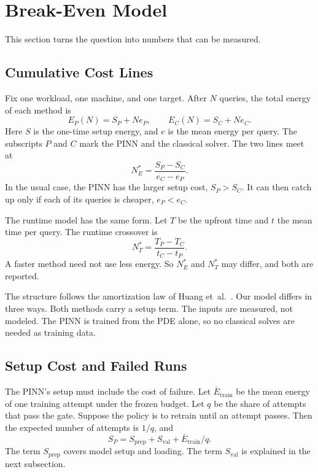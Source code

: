 \documentclass[journal]{IEEEtran}
\newcommand{\Nstar}{N^{\ast}}
\begin{document}
\section{Break-Even Model}\label{sec:model}

This section turns the question into numbers that can be measured.

\subsection{Cumulative Cost Lines}
Fix one workload, one machine, and one target. After $N$ queries, the total energy of each method is
\begin{equation}
E_P(N)=S_P+N e_P,\qquad E_C(N)=S_C+N e_C .
\label{eq:cost}
\end{equation}
Here $S$ is the one-time setup energy, and $e$ is the mean energy per query. The subscripts $P$ and $C$ mark the PINN and the classical solver. The two lines meet at
\begin{equation}
\Nstar_E=\frac{S_P-S_C}{e_C-e_P}.
\label{eq:nstar}
\end{equation}
In the usual case, the PINN has the larger setup cost, $S_P>S_C$. It can then catch up only if each of its queries is cheaper, $e_P<e_C$.

The runtime model has the same form. Let $T$ be the upfront time and $t$ the mean time per query. The runtime crossover is
\begin{equation}
\Nstar_T=\frac{T_P-T_C}{t_C-t_P}.
\label{eq:ntime}
\end{equation}
A faster method need not use less energy. So $\Nstar_E$ and $\Nstar_T$ may differ, and both are reported.

The structure follows the amortization law of Huang et~al.~\cite{huang2026review}. Our model differs in three ways. Both methods carry a setup term. The inputs are measured, not modeled. The PINN is trained from the PDE alone, so no classical solves are needed as training data.

\subsection{Setup Cost and Failed Runs}
The PINN's setup must include the cost of failure. Let $\bar E_{\mathrm{train}}$ be the mean energy of one training attempt under the frozen budget. Let $q$ be the share of attempts that pass the gate. Suppose the policy is to retrain until an attempt passes. Then the expected number of attempts is $1/q$, and
\begin{equation}
S_P=S_{\mathrm{prep}}+S_{\mathrm{val}}+\bar E_{\mathrm{train}}/q .
\label{eq:retry}
\end{equation}
The term $S_{\mathrm{prep}}$ covers model setup and loading. The term $S_{\mathrm{val}}$ is explained in the next subsection.
\end{document}
